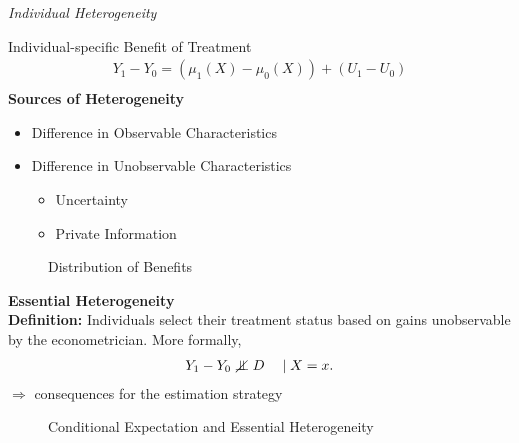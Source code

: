 \begin{frame}\begin{center}
		\LARGE\textit{Individual Heterogeneity}
\end{center}\end{frame}
\begin{frame}
	Individual-specific Benefit of Treatment
	\begin{align*}
		Y_1 - Y_0 = (\mu_1(X) - \mu_0(X)) + (U_1 - U_0)\\
	\end{align*}
	\textbf{Sources of Heterogeneity}
	\begin{itemize}\setlength\itemsep{1em}
		\item Difference in Observable Characteristics
		\item Difference in Unobservable Characteristics\medskip
		\begin{itemize}\setlength\itemsep{1em}
			\item  Uncertainty
			\item Private Information
		\end{itemize}
	\end{itemize}
\end{frame}
\begin{frame}
	\begin{figure}\caption{Distribution of Benefits}
	\end{figure}
\end{frame}
\begin{frame}
	\textbf{Essential Heterogeneity}\\\vspace{0.5cm}
	\textbf{Definition:} Individuals select their treatment status based on
	gains unobservable by the econometrician. More formally,
	\begin{align*}
		Y_1 - Y_0 \notindep D\quad \mid X = x.
	\end{align*}
	\(\Rightarrow\) consequences for the estimation strategy
\end{frame}
\begin{frame}
	\begin{figure}\caption{Conditional Expectation and Essential Heterogeneity}
	\end{figure}
\end{frame}
